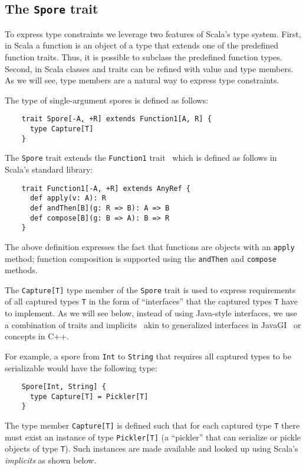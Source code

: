 \documentclass{llncs}
\begin{document}
\subsection{The \texttt{Spore} trait}

To express type constraints we leverage two features of Scala's type system.
First, in Scala a function is an object of a type that extends one of the
predefined function traits. Thus, it is possible to subclass the predefined
function types. Second, in Scala classes and traits can be refined with value
and type members. As we will see, type members are a natural way to express
type constraints.

The type of single-argument spores is defined as follows:

\begin{lstlisting}
    trait Spore[-A, +R] extends Function1[A, R] {
      type Capture[T]
    }
\end{lstlisting}
\noindent
The \verb|Spore| trait extends the \verb|Function1| trait~ which is defined as
follows in Scala's standard library:

\begin{lstlisting}
    trait Function1[-A, +R] extends AnyRef {
      def apply(v: A): R
      def andThen[B](g: R => B): A => B
      def compose[B](g: B => A): B => R
    }
\end{lstlisting}
\noindent
The above definition expresses the fact that functions are objects with an
\verb|apply| method; function composition is supported using the
\verb|andThen| and \verb|compose| methods.

The \verb|Capture[T]| type member of the \verb|Spore| trait is used to express
requirements of all captured types \verb|T| in the form of ``interfaces'' that
the captured types \verb|T| have to implement. As we will see below, instead
of using Java-style interfaces, we use a combination of traits and
implicits~\cite{Oliveira2010} akin to generalized interfaces in
JavaGI~\cite{WehrT11} or concepts in C++.

For example, a spore from \verb|Int| to \verb|String| that requires all
captured types to be serializable would have the following type:
\begin{lstlisting}
    Spore[Int, String] {
      type Capture[T] = Pickler[T]
    }
\end{lstlisting}
\noindent
The type member \verb|Capture[T]| is defined such that for each captured type
\verb|T| there must exist an instance of type \verb|Pickler[T]| (a ``pickler''
that can serialize or pickle objects of type \verb|T|). Such instances are
made available and looked up using Scala's {\em implicits} as shown below.
\end{document}
